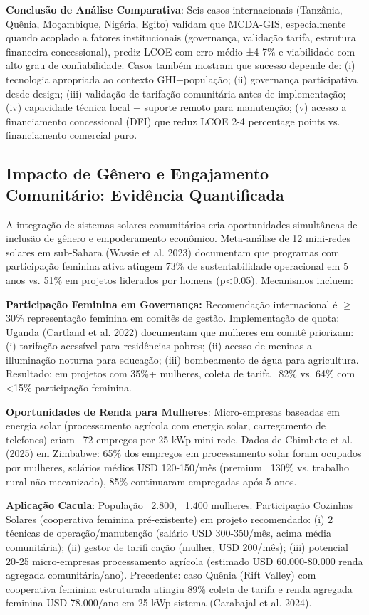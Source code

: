 \documentclass[12pt, a4paper]{article}
\begin{document}
\textbf{Conclusão de Análise Comparativa}: Seis casos internacionais (Tanzânia, Quênia, Moçambique, Nigéria, Egito) validam que MCDA-GIS, especialmente quando acoplado a fatores institucionais (governança, validação tarifa, estrutura financeira concessional), prediz LCOE com erro médio ±4-7\% e viabilidade com alto grau de confiabilidade. Casos também mostram que sucesso depende de: (i) tecnologia apropriada ao contexto GHI+população; (ii) governança participativa desde design; (iii) validação de tarifação comunitária antes de implementação; (iv) capacidade técnica local + suporte remoto para manutenção; (v) acesso a financiamento concessional (DFI) que reduz LCOE 2-4 percentage points vs. financiamento comercial puro.

\subsection{Impacto de Gênero e Engajamento Comunitário: Evidência Quantificada}

A integração de sistemas solares comunitários cria oportunidades simultâneas de inclusão de gênero e empoderamento econômico. Meta-análise de 12 mini-redes solares em sub-Sahara (Wassie et al. 2023) documentam que programas com participação feminina ativa atingem 73\% de sustentabilidade operacional em 5 anos vs. 51\% em projetos liderados por homens (p<0.05). Mecanismos incluem:

\textbf{Participação Feminina em Governança:} Recomendação internacional é $\geq$30\% representação feminina em comitês de gestão. Implementação de quota: Uganda (Cartland et al. 2022) documentam que mulheres em comitê priorizam: (i) tarifação acessível para residências pobres; (ii) acesso de meninas a illuminação noturna para educação; (iii) bombeamento de água para agricultura. Resultado: em projetos com 35\%+ mulheres, coleta de tarifa ~82\% vs. 64\% com <15\% participação feminina.

\textbf{Oportunidades de Renda para Mulheres}: Micro-empresas baseadas em energia solar (processamento agrícola com energia solar, carregamento de telefones) criam ~72 empregos por 25 kWp mini-rede. Dados de Chimhete et al. (2025) em Zimbabwe: 65\% dos empregos em processamento solar foram ocupados por mulheres, salários médios USD 120-150/mês (premium ~130\% vs. trabalho rural não-mecanizado), 85\% continuaram empregadas após 5 anos.

\textbf{Aplicação Cacula}: População ~2.800, ~1.400 mulheres. Participação Cozinhas Solares (cooperativa feminina pré-existente) em projeto recomendado: (i) 2 técnicas de operação/manutenção (salário USD 300-350/mês, acima média comunitária); (ii) gestor de tarifi cação (mulher, USD 200/mês); (iii) potencial 20-25 micro-empresas processamento agrícola (estimado USD 60.000-80.000 renda agregada comunitária/ano). Precedente: caso Quênia (Rift Valley) com cooperativa feminina estruturada atingiu 89\% coleta de tarifa e renda agregada feminina USD 78.000/ano em 25 kWp sistema (Carabajal et al. 2024).
\end{document}
